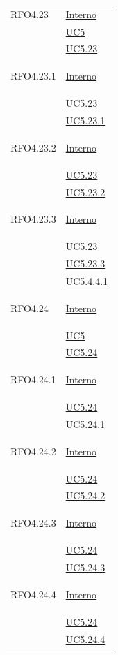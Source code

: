\begin{longtable}{|>{\centering}m{5cm}|m{5cm}<{\centering}|}
\hypertarget{RFO4.23}{RFO4.23}  & \hyperlink{Interno}{Interno}\\
&\hyperref[UC5]{UC5}\\
&\hyperref[UC5.23]{UC5.23}\\ \hline

\hypertarget{RFO4.23.1}{RFO4.23.1} &  \hyperlink{Interno}{Interno}\\
&\hyperref[UC5.23]{UC5.23}\\
&\hyperref[UC5.23.1]{UC5.23.1}\\ \hline

\hypertarget{RFO4.23.2}{RFO4.23.2} & \hyperlink{Interno}{Interno}\\
&\hyperref[UC5.23]{UC5.23}\\
&\hyperref[UC5.23.2]{UC5.23.2}\\ \hline

\hypertarget{RFO4.23.3}{RFO4.23.3} & \hyperlink{Interno}{Interno}\\
&\hyperref[UC5.23]{UC5.23}\\
&\hyperref[UC5.23.3]{UC5.23.3}\\ 
&\hyperref[UC5.4.4.1]{UC5.4.4.1}\\ \hline

\hypertarget{RFO4.24}{RFO4.24} & \hyperlink{Interno}{Interno}\\
&\hyperref[UC5]{UC5}\\
&\hyperref[UC5.24]{UC5.24}\\ \hline

\hypertarget{RFO4.24.1}{RFO4.24.1} &   \hyperlink{Interno}{Interno}\\
&\hyperref[UC5.24]{UC5.24}\\
&\hyperref[UC5.24.1]{UC5.24.1}\\ \hline

\hypertarget{RFO4.24.2}{RFO4.24.2} &  \hyperlink{Interno}{Interno}\\
&\hyperref[UC5.24]{UC5.24}\\
&\hyperref[UC5.24.2]{UC5.24.2}\\ \hline

\hypertarget{RFO4.24.3}{RFO4.24.3} &  \hyperlink{Interno}{Interno}\\
&\hyperref[UC5.24]{UC5.24}\\
&\hyperref[UC5.24.3]{UC5.24.3}\\ \hline

\hypertarget{RFO4.24.4}{RFO4.24.4} &  \hyperlink{Interno}{Interno}\\
&\hyperref[UC5.24]{UC5.24}\\
&\hyperref[UC5.24.4]{UC5.24.4}\\ \hline


\end{longtable}
